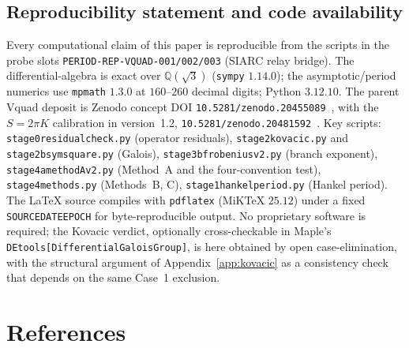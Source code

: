 \documentclass[11pt,reqno]{amsart}
\renewcommand{\_}{\vquadorigunderscore\allowbreak}
\theoremstyle{plain}
\theoremstyle{definition}
\newcommand{\Qsqrt}{\mathbb{Q}(\sqrt3)}
\begin{document}
\subsection{Reproducibility statement and code availability}\label{app:repro}
Every computational claim of this paper is reproducible from the scripts in the probe slots
\texttt{PERIOD-REP-VQUAD-001/002/003} (SIARC relay bridge). The differential-algebra is exact over
$\Qsqrt$ (\texttt{sympy} $1.14.0$); the asymptotic/period numerics use \texttt{mpmath} $1.3.0$ at
$160$--$260$ decimal digits; Python $3.12.10$. The parent V\_quad deposit is Zenodo concept DOI
\texttt{10.5281/zenodo.20455089}~\cite{Vquad}, with the $S=2\pi K$ calibration in version~1.2,
\texttt{10.5281/zenodo.20481592}~\cite{StokesNote}. Key scripts:
\texttt{stage0\_residual\_check.py} (operator residuals), \texttt{stage2\_kovacic.py} and
\texttt{stage2b\_symsquare.py} (Galois), \texttt{stage3b\_frobenius\_v2.py} (branch exponent),
\texttt{stage4a\_methodA\_v2.py} (Method~A and the four-convention test),
\texttt{stage4\_methods.py} (Methods~B, C), \texttt{stage1\_hankel\_period.py} (Hankel period).
The LaTeX source compiles with \texttt{pdflatex} (MiKTeX $25.12$) under a fixed
\texttt{SOURCE\_DATE\_EPOCH} for byte-reproducible output. No proprietary software is required;
the Kovacic verdict, optionally cross-checkable in Maple's
\texttt{DEtools[DifferentialGaloisGroup]}, is here obtained by open case-elimination, with the
structural argument of Appendix~\ref{app:kovacic} as a consistency check that depends on the
same Case~1 exclusion.

\section*{References}
\end{document}
